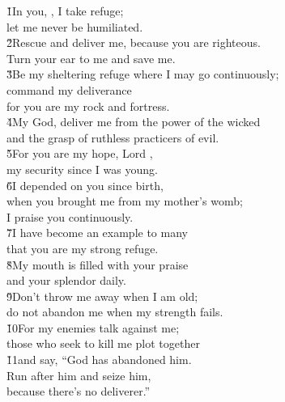 \begin{poetry}
\poeml \v{1}In you, , I take refuge; \\
\poemll    let me never be humiliated. \\
\poeml \v{2}Rescue and deliver me, because you are righteous. \\
\poemll    Turn your ear to me and save me. \\
\poeml \v{3}Be my sheltering refuge where I may go continuously; \\
\poemll    command my deliverance \\
\poemlll       for you are my rock and fortress. \\
\poeml \v{4}My God, deliver me from the power of the wicked \\
\poemll    and the grasp of ruthless practicers of evil. \\
\poeml \v{5}For you are my hope, Lord , \\
\poemll    my security since I was young. \\
\poeml \v{6}I depended on you since birth, \\
\poemll    when you brought me from my mother's womb; \\
\poemlll       I praise you continuously. \\
\poeml \v{7}I have become an example to many \\
\poemll    that you are my strong refuge. \\
\poeml \v{8}My mouth is filled with your praise \\
\poemll    and your splendor daily. \\
\poeml \v{9}Don't throw me away when I am old; \\
\poemll    do not abandon me when my strength fails. \\
\poeml \v{10}For my enemies talk against me; \\
\poemll    those who seek to kill me plot together \\
\poeml \v{11}and say, ``God has abandoned him. \\
\poemll    Run after him and seize him, \\
\poemlll       because there's no deliverer.'' \\

\end{poetry}
